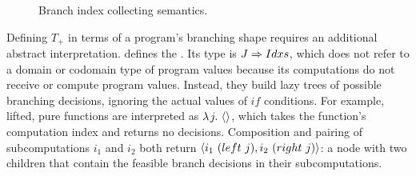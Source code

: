 \begin{figure}[!tb]

\caption[Branch index collecting semantics]{Branch index collecting semantics.}
\label{fig:collecting-semantics}
\end{figure}

Defining $T_+$ in terms of a program's branching shape requires an additional abstract interpretation.
 defines the .
Its type is $J \Rightarrow Idxs$, which does not refer to a domain or codomain type of program values because its computations do not receive or compute program values.
Instead, they build lazy trees of possible branching decisions, ignoring the actual values of $if$ conditions.
For example, lifted, pure functions are interpreted as $\lambda\mspace{2mu}{j}\ldotp\, \langle{}\rangle$, which takes the function's computation index and returns no decisions.
Composition and pairing of subcomputations $i_1$ and $i_2$ both return $\langle{i_1~(left~j),i_2~(right~j)}\rangle$: a node with two children that contain the feasible branch decisions in their subcomputations.

